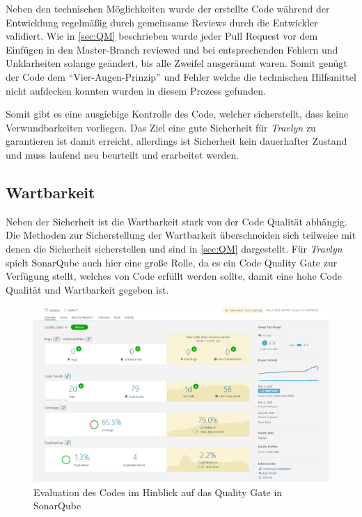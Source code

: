 	Neben den technischen Möglichkeiten wurde der erstellte Code während der Entwicklung regelmäßig durch gemeinsame Reviews durch die Entwickler validiert. Wie in \autoref{sec:QM} beschrieben wurde jeder Pull Request vor dem Einfügen in den Master-Branch reviewed und bei entsprechenden Fehlern und Unklarheiten solange geändert, bis alle Zweifel ausgeräumt waren. Somit genügt der Code dem \enquote{Vier-Augen-Prinzip} und Fehler welche die technischen Hilfsmittel nicht aufdecken konnten wurden in diesem Prozess gefunden.
	
	\vspace{0.25cm}
	
	Somit gibt es eine ausgiebige Kontrolle des Code, welcher sicherstellt, dass keine Verwundbarkeiten vorliegen. Das Ziel eine gute Sicherheit für \textit{Travlyn} zu garantieren ist damit erreicht, allerdings ist Sicherheit kein dauerhafter Zustand und muss laufend neu beurteilt und erarbeitet werden.
	
	\subsection{Wartbarkeit}
	Neben der Sicherheit ist die Wartbarkeit stark von der Code Qualität abhängig. Die Methoden zur Sicherstellung der Wartbarkeit überschneiden sich teilweise mit denen die Sicherheit sicherstellen und sind in \autoref{sec:QM} dargestellt. Für \textit{Travlyn} spielt SonarQube auch hier eine große Rolle, da es ein Code Quality Gate zur Verfügung stellt, welches von Code erfüllt werden sollte, damit eine hohe Code Qualität und Wartbarkeit gegeben ist.
	
	\begin{figure}[ht!]
		\centering
		\includegraphics[width=1\textwidth]{images/sonar_passed_QG.png}
		\caption{Evaluation des Codes im Hinblick auf das Quality Gate in SonarQube}
		\label{fig:soarqube_QG}
	\end{figure}

